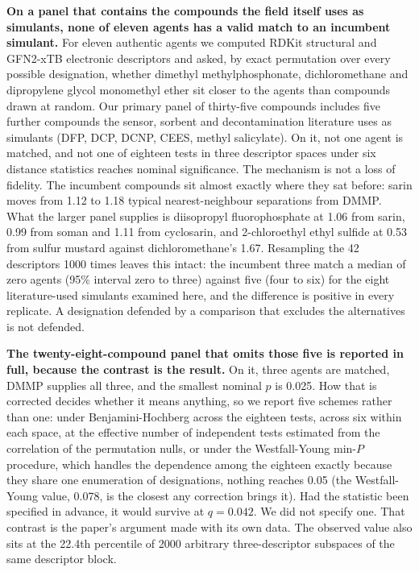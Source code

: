 \documentclass[11pt,a4paper]{article}
\begin{document}
\textbf{On a panel that contains the compounds the field itself uses as
simulants, none of eleven agents has a valid match to an incumbent simulant.}
For eleven authentic agents we computed RDKit structural and GFN2-xTB electronic
descriptors and asked, by exact permutation over every possible designation,
whether dimethyl methylphosphonate, dichloromethane and dipropylene glycol
monomethyl ether sit closer to the agents than compounds drawn at random. Our
primary panel of thirty-five compounds includes five further compounds the
sensor, sorbent and decontamination literature uses as simulants (DFP, DCP,
DCNP, CEES, methyl salicylate). On it, not one agent is matched, and not one of
eighteen tests in three descriptor spaces under six distance statistics reaches
nominal significance. The mechanism is not a loss of fidelity. The incumbent compounds sit
almost exactly where they sat before: sarin moves from 1.12 to 1.18 typical
nearest-neighbour separations from DMMP. What the larger panel supplies is
diisopropyl fluorophosphate at 1.06 from sarin, 0.99 from soman and 1.11 from
cyclosarin, and 2-chloroethyl ethyl sulfide at 0.53 from sulfur mustard against
dichloromethane's 1.67. Resampling the 42 descriptors 1000 times leaves this
intact: the incumbent three match a median of zero agents (95\% interval zero to
three) against five (four to six) for the eight literature-used simulants
examined here, and
the difference is positive in every replicate. A designation defended by a
comparison that excludes the alternatives is not defended.

\textbf{The twenty-eight-compound panel that omits those five is reported in
full, because the contrast is the result.} On it, three agents are matched, DMMP
supplies all three, and the smallest nominal $p$ is 0.025. How that is corrected
decides whether it means anything, so we report five schemes rather than one:
under Benjamini-Hochberg across the eighteen tests, across six within each
space, at the effective number of independent tests estimated from the
correlation of the permutation nulls, or under the Westfall-Young min-$P$
procedure, which handles the dependence among the eighteen exactly because they
share one enumeration of designations, nothing reaches 0.05 (the Westfall-Young
value, 0.078, is the closest any correction brings it). Had the statistic
been specified in advance, it would survive at $q=0.042$. We did not specify one.
That contrast is the paper's argument made with its own data. The observed value
also sits at the 22.4th percentile of 2000 arbitrary three-descriptor subspaces
of the same descriptor block.
\end{document}
